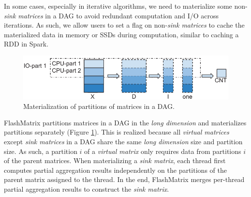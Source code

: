 In some cases, especially in iterative algorithms,
we need to materialize some non-\textit{sink matrices} in a DAG to avoid
redundant computation and I/O across iterations. As such, we allow users to
set a flag on non-\textit{sink matrices} to cache the materialized data in memory
or SSDs during computation, similar to caching a RDD in Spark.

\begin{figure}
	\centering
	\includegraphics[scale=0.6]{FlashMatrix_figs/materialize.pdf}
	\caption{Materialization of partitions of matrices in a DAG.}
	\label{fig:mater}
\end{figure}

FlashMatrix partitions matrices in a DAG in the \textit{long dimension} and
materializes partitions separately (Figure \ref{fig:mater}). This is realized
because all \textit{virtual matrices} except \textit{sink matrices} in a DAG
share the same \textit{long dimension} size and partition size. As such,
a partition $i$ of a \textit{virtual matrix} only requires data from partitions
$i$ of the parent matrices.
When materializing a \textit{sink matrix}, each thread first computes partial
aggregation results independently on the partitions of the parent matrix
assigned to the thread. In the end, FlashMatrix merges per-thread partial
aggregation results to construct the \textit{sink matrix}.

